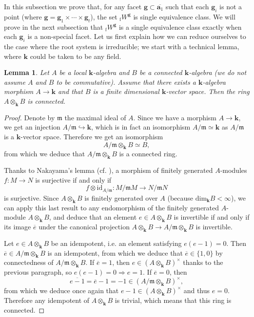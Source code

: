 \documentclass[11pt]{amsart}
\theoremstyle{plain}
\newtheorem{lem}[thm]{Lemma}
\theoremstyle{remark}
\numberwithin{equation}{section}
\begin{document}
	In this subsection we prove that, for any facet $\mathbf{g}\subset\overline{\mathbf{a}_1}$ such that each $\mathbf{g}_i$ is not a point (where $\mathbf{g}=\mathbf{g}_1\times\cdots\times\mathbf{g}_t$), the set ${_\mathrm{f}W}^\mathbf{g}$ is single equivalence class. We will prove in the next subsection that ${_\mathrm{f}W}^\mathbf{g}$ is a single equivalence class exactly when each $\mathbf{g}_i$ is a non-special facet. Let us first explain how we can reduce ourselves to the case where the root system is irreducible; we start with a technical lemma, where $\mathbf{k}$ could be taken to be any field.  
	\begin{lem}\label{alg non com}
		Let $A$ be a local $\mathbf{k}$-algebra and $B$ be a connected $\mathbf{k}$-algebra (we do not assume $A$ and $B$ to be commutative). Assume that there exists a $\mathbf {k}$-algebra morphism $A\to \mathbf{k}$ and that $B$ is a finite dimensional $\mathbf{k}$-vector space. Then the ring $A\otimes_\mathbf{k}B$ is connected. 
	\end{lem}
	\begin{proof}
		Denote by $\mathfrak{m}$ the maximal ideal of $A$. Since we have a morphism $A\to \mathbf{k}$, we get an injection $A/\mathfrak{m}\hookrightarrow \mathbf{k}$, which is in fact an isomorphism $A/\mathfrak{m}\simeq \mathbf{k}$ as $A/\mathfrak{m}$ is a $\mathbf{k}$-vector space. Therefore we get an isomorphism 
		$$A/\mathfrak{m}\otimes_\mathbf{k}B\simeq B, $$
		from which we deduce that $A/\mathfrak{m}\otimes_\mathbf{k}B$ is a connected ring.

Thanks to Nakayama's lemma (cf. \cite[§2, Proposition 4.2.3]{knus2012quadratic}), a morphism of finitely generated $A$-modules $f:M\to N$ is surjective if and only if $$f\otimes \mathrm{id}_{A/\mathfrak{m}}:M/\mathfrak{m}M\to N/\mathfrak{m}N$$ is surjective. Since $A\otimes_\mathbf{k}B$ is finitely generated over $A$ (because $\mathrm{dim}_\mathbf{k}B<\infty$),  we can apply this last result to any endomorphism of the finitely generated $A$-module $A\otimes_\mathbf{k}B$, and deduce that an element $e\in A\otimes_\mathbf{k}B$ is invertible if and only if its image  $\overline{e}$ under the canonical projection $A\otimes_\mathbf{k}B\to A/\mathfrak{m}\otimes_\mathbf{k}B$ is invertible.
		
	
		
		Let $e\in A\otimes_\mathbf{k}B$ be an idempotent, i.e. an element satisfying $e(e-1)=0$. Then $\overline{e}\in A/\mathfrak{m}\otimes_\mathbf{k}B$ is an idempotent, from which we deduce that $\overline{e}\in\{1,0\}$ by connectedness of $A/\mathfrak{m}\otimes_\mathbf{k}B$. If $\overline{e}=1$, then $e\in (A\otimes_\mathbf{k}B)^\times$ thanks to the previous paragraph, so $e(e-1)=0\Rightarrow e=1$. If $\overline{e}=0$, then $$\overline{e-1}=\overline{e}-1=-1\in(A/\mathfrak{m}\otimes_\mathbf{k}B)^\times,$$
		from which we deduce once again that $e-1\in (A\otimes_\mathbf{k}B)^\times$ and thus $e=0$. Therefore any idempotent of $A\otimes_\mathbf{k}B$ is trivial, which means that this ring is connected. \end{proof}
\end{document}
